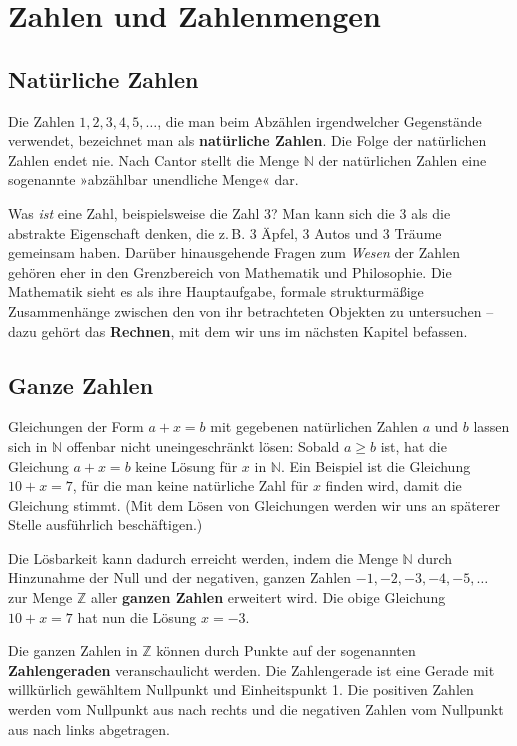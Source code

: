 \section{Zahlen und Zahlenmengen}

\subsection{Natürliche Zahlen}

Die Zahlen $1,2,3,4,5,\ldots$, die man beim Abzählen irgendwelcher Gegenstände verwendet, bezeichnet man als \textbf{natürliche Zahlen}. Die Folge der natürlichen Zahlen endet nie. Nach Cantor stellt die Menge $\mathbb{N}$ der natürlichen Zahlen eine sogenannte »abzählbar unendliche Menge« dar.

Was \emph{ist} eine Zahl, beispielsweise die Zahl 3? Man kann sich die 3 als die abstrakte Eigenschaft denken, die z.\,B. 3 Äpfel, 3 Autos und 3 Träume gemeinsam haben. Darüber hinausgehende Fragen zum \emph{Wesen} der Zahlen gehören eher in den Grenzbereich von Mathematik und Philosophie. Die Mathematik sieht es als ihre Hauptaufgabe, formale strukturmäßige Zusammenhänge zwischen den von ihr betrachteten Objekten zu untersuchen -- dazu gehört das \textbf{Rechnen}, mit dem wir uns im nächsten Kapitel befassen.

\subsection{Ganze Zahlen}

Gleichungen der Form $a + x = b$ mit gegebenen natürlichen Zahlen $a$ und $b$ lassen sich in $\mathbb{N}$ offenbar nicht uneingeschränkt lösen: Sobald $a \geq b$ ist, hat die Gleichung $a + x = b$ keine Lösung für $x$ in $\mathbb{N}$. Ein Beispiel ist die Gleichung $10 + x = 7$, für die man keine natürliche Zahl für $x$ finden wird, damit die Gleichung stimmt. (Mit dem Lösen von Gleichungen werden wir uns an späterer Stelle ausführlich beschäftigen.)

Die Lösbarkeit kann dadurch erreicht werden, indem die Menge $\mathbb{N}$ durch Hinzunahme der Null und der negativen, ganzen Zahlen $-1, -2, -3, -4, -5, \ldots$ zur Menge $\mathbb{Z}$ aller \textbf{ganzen Zahlen} erweitert wird. Die obige Gleichung $10 + x = 7$ hat nun die Lösung $x = -3$.

Die ganzen Zahlen in $\mathbb{Z}$ können durch Punkte auf der sogenannten \textbf{Zahlengeraden} veranschaulicht werden. Die Zahlengerade ist eine Gerade mit willkürlich gewähltem Nullpunkt und Einheitspunkt 1. Die positiven Zahlen werden vom Nullpunkt aus nach rechts und die negativen Zahlen vom Nullpunkt aus nach links abgetragen.

